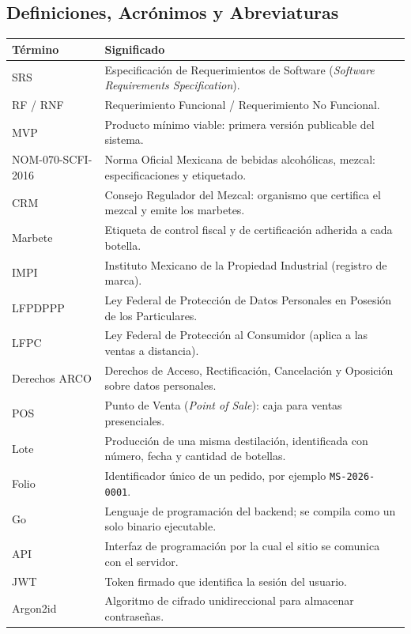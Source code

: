 \documentclass[11pt,letterpaper]{article}
\begin{document}
\subsection{Definiciones, Acrónimos y Abreviaturas}
\renewcommand{\arraystretch}{1.25}
\begin{longtable}{@{} >{\raggedright\arraybackslash}p{3.4cm} >{\raggedright\arraybackslash}p{12.4cm} @{}}
\toprule
\textbf{Término} & \textbf{Significado} \\
\midrule
\endhead
SRS & Especificación de Requerimientos de Software (\textit{Software Requirements Specification}). \\
RF / RNF & Requerimiento Funcional / Requerimiento No Funcional. \\
MVP & Producto mínimo viable: primera versión publicable del sistema. \\
NOM-070-SCFI-2016 & Norma Oficial Mexicana de bebidas alcohólicas, mezcal: especificaciones y etiquetado. \\
CRM & Consejo Regulador del Mezcal: organismo que certifica el mezcal y emite los marbetes. \\
Marbete & Etiqueta de control fiscal y de certificación adherida a cada botella. \\
IMPI & Instituto Mexicano de la Propiedad Industrial (registro de marca). \\
LFPDPPP & Ley Federal de Protección de Datos Personales en Posesión de los Particulares. \\
LFPC & Ley Federal de Protección al Consumidor (aplica a las ventas a distancia). \\
Derechos ARCO & Derechos de Acceso, Rectificación, Cancelación y Oposición sobre datos personales. \\
POS & Punto de Venta (\textit{Point of Sale}): caja para ventas presenciales. \\
Lote & Producción de una misma destilación, identificada con número, fecha y cantidad de botellas. \\
Folio & Identificador único de un pedido, por ejemplo \texttt{MS-2026-0001}. \\
Go & Lenguaje de programación del backend; se compila como un solo binario ejecutable. \\
API & Interfaz de programación por la cual el sitio se comunica con el servidor. \\
JWT & Token firmado que identifica la sesión del usuario. \\
Argon2id & Algoritmo de cifrado unidireccional para almacenar contraseñas. \\

\end{longtable}
\end{document}
